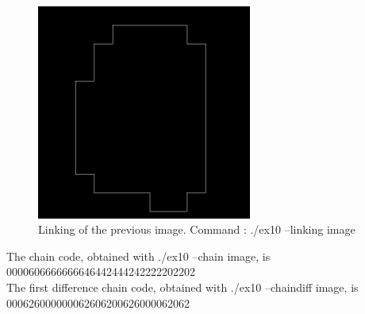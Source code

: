 \documentclass[10pt]{article}
\begin{document}
\begin{figure}[!ht]
	\centering
	\includegraphics[height=200pt]{./ex10/noisy_link.jpg}
	\caption{Linking of the previous image. Command : ./ex10 --linking image}
\end{figure}
\clearpage
The chain code, obtained with ./ex10 --chain image, is 0000606666666646442444242222202202\\

The first difference chain code, obtained with ./ex10 --chaindiff image, is 
000626000000062606200626000062062\\
\end{document}
